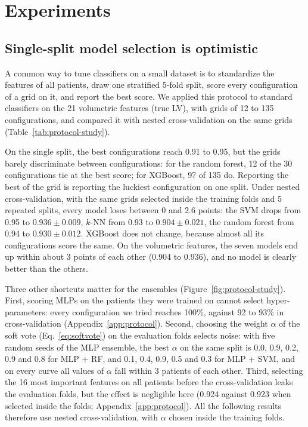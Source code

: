 \section{Experiments}

\subsection{Single-split model selection is optimistic}
\label{sec:protocol-study}
A common way to tune classifiers on a small dataset is to standardize the features of all patients, draw one stratified 5-fold split, score every configuration of a grid on it, and report the best score. We applied this protocol to standard classifiers on the 21 volumetric features (true LV), with grids of 12 to 135 configurations, and compared it with nested cross-validation on the same grids (Table~\ref{tab:protocol-study}).



On the single split, the best configurations reach 0.91 to 0.95, but the grids barely discriminate between configurations: for the random forest, 12 of the 30 configurations tie at the best score; for XGBoost, 97 of 135 do. Reporting the best of the grid is reporting the luckiest configuration on one split. Under nested cross-validation, with the same grids selected inside the training folds and 5 repeated splits, every model loses between 0 and 2.6 points: the SVM drops from 0.95 to $0.936 \pm 0.009$, $k$-NN from 0.93 to $0.904 \pm 0.021$, the random forest from 0.94 to $0.930 \pm 0.012$. XGBoost does not change, because almost all its configurations score the same. On the volumetric features, the seven models end up within about 3 points of each other (0.904 to 0.936), and no model is clearly better than the others.

Three other shortcuts matter for the ensembles (Figure~\ref{fig:protocol-study}). First, scoring MLPs on the patients they were trained on cannot select hyper-parameters: every configuration we tried reaches 100\%, against 92 to 93\% in cross-validation (Appendix~\ref{app:protocol}). Second, choosing the weight $\alpha$ of the soft vote (Eq.~\ref{eq:softvote}) on the evaluation folds selects noise: with five random seeds of the MLP ensemble, the best $\alpha$ on the same split is 0.0, 0.9, 0.2, 0.9 and 0.8 for MLP + RF, and 0.1, 0.4, 0.9, 0.5 and 0.3 for MLP + SVM, and on every curve all values of $\alpha$ fall within 3 patients of each other. Third, selecting the 16 most important features on all patients before the cross-validation leaks the evaluation folds, but the effect is negligible here (0.924 against 0.923 when selected inside the folds; Appendix~\ref{app:protocol}). All the following results therefore use nested cross-validation, with $\alpha$ chosen inside the training folds.

